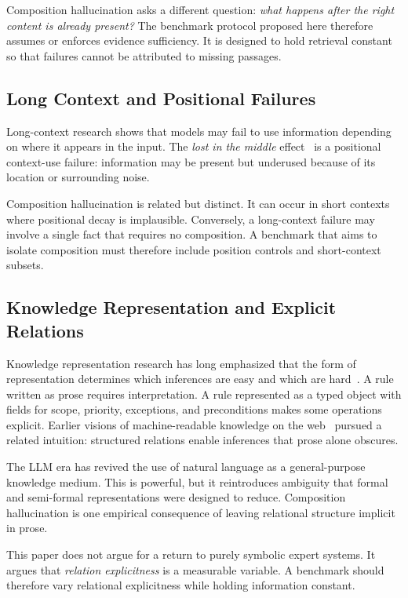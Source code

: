 \documentclass[11pt]{article}
\begin{document}
Composition hallucination asks a different question: \emph{what happens after the right content is already present?} The benchmark protocol proposed here therefore assumes or enforces evidence sufficiency. It is designed to hold retrieval constant so that failures cannot be attributed to missing passages.

\subsection{Long Context and Positional Failures}

Long-context research shows that models may fail to use information depending on where it appears in the input. The \emph{lost in the middle} effect~\cite{liu2024lost} is a positional context-use failure: information may be present but underused because of its location or surrounding noise.

Composition hallucination is related but distinct. It can occur in short contexts where positional decay is implausible. Conversely, a long-context failure may involve a single fact that requires no composition. A benchmark that aims to isolate composition must therefore include position controls and short-context subsets.

\subsection{Knowledge Representation and Explicit Relations}

Knowledge representation research has long emphasized that the form of representation determines which inferences are easy and which are hard~\cite{davis1993kr}. A rule written as prose requires interpretation. A rule represented as a typed object with fields for scope, priority, exceptions, and preconditions makes some operations explicit. Earlier visions of machine-readable knowledge on the web~\cite{bernerslee2001semantic} pursued a related intuition: structured relations enable inferences that prose alone obscures.

The LLM era has revived the use of natural language as a general-purpose knowledge medium. This is powerful, but it reintroduces ambiguity that formal and semi-formal representations were designed to reduce. Composition hallucination is one empirical consequence of leaving relational structure implicit in prose.

This paper does not argue for a return to purely symbolic expert systems. It argues that \emph{relation explicitness} is a measurable variable. A benchmark should therefore vary relational explicitness while holding information constant.
\end{document}
